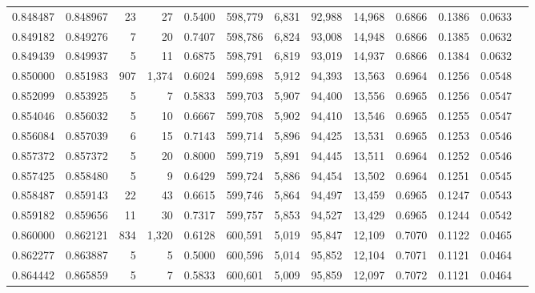 \begin{tabular}{rrrrrrrrrrrrr}
0.848487 & 0.848967 &     23 &    27 &                                     0.5400 & 598,779 &   6,831 &  92,988 &  14,968 & 0.6866 & 0.1386 & 0.0633 \\
0.849182 & 0.849276 &      7 &    20 &                                     0.7407 & 598,786 &   6,824 &  93,008 &  14,948 & 0.6866 & 0.1385 & 0.0632 \\
0.849439 & 0.849937 &      5 &    11 &                                     0.6875 & 598,791 &   6,819 &  93,019 &  14,937 & 0.6866 & 0.1384 & 0.0632 \\
0.850000 & 0.851983 &    907 & 1,374 &                                     0.6024 & 599,698 &   5,912 &  94,393 &  13,563 & 0.6964 & 0.1256 & 0.0548 \\
0.852099 & 0.853925 &      5 &     7 &                                     0.5833 & 599,703 &   5,907 &  94,400 &  13,556 & 0.6965 & 0.1256 & 0.0547 \\
0.854046 & 0.856032 &      5 &    10 &                                     0.6667 & 599,708 &   5,902 &  94,410 &  13,546 & 0.6965 & 0.1255 & 0.0547 \\
0.856084 & 0.857039 &      6 &    15 &                                     0.7143 & 599,714 &   5,896 &  94,425 &  13,531 & 0.6965 & 0.1253 & 0.0546 \\
0.857372 & 0.857372 &      5 &    20 &                                     0.8000 & 599,719 &   5,891 &  94,445 &  13,511 & 0.6964 & 0.1252 & 0.0546 \\
0.857425 & 0.858480 &      5 &     9 &                                     0.6429 & 599,724 &   5,886 &  94,454 &  13,502 & 0.6964 & 0.1251 & 0.0545 \\
0.858487 & 0.859143 &     22 &    43 &                                     0.6615 & 599,746 &   5,864 &  94,497 &  13,459 & 0.6965 & 0.1247 & 0.0543 \\
0.859182 & 0.859656 &     11 &    30 &                                     0.7317 & 599,757 &   5,853 &  94,527 &  13,429 & 0.6965 & 0.1244 & 0.0542 \\
0.860000 & 0.862121 &    834 & 1,320 &                                     0.6128 & 600,591 &   5,019 &  95,847 &  12,109 & 0.7070 & 0.1122 & 0.0465 \\
0.862277 & 0.863887 &      5 &     5 &                                     0.5000 & 600,596 &   5,014 &  95,852 &  12,104 & 0.7071 & 0.1121 & 0.0464 \\
0.864442 & 0.865859 &      5 &     7 &                                     0.5833 & 600,601 &   5,009 &  95,859 &  12,097 & 0.7072 & 0.1121 & 0.0464 \\

\end{tabular}
